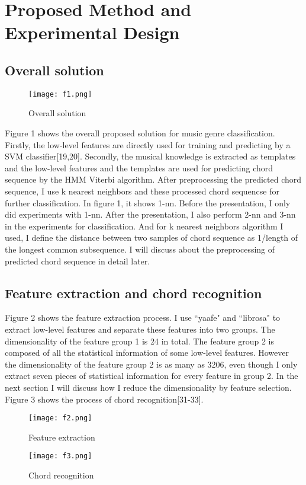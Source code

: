 \documentclass{article} %
\begin{document}
\section{Proposed Method and Experimental Design}
\subsection{Overall solution}
    \begin{figure}[H]
	
	\centering
	\texttt{[image: f1.png]}
	\caption{Overall solution}
	\end{figure}
	Figure 1 shows the overall proposed solution for music genre classification. Firstly, the low-level features are directly used for training and predicting by a SVM classifier[19,20]. Secondly, the musical knowledge is extracted as templates and the low-level features and the templates are used for predicting chord sequence by the HMM Viterbi algorithm. After preprocessing the predicted chord sequence, I use k nearest neighbors and these processed chord sequencse for further classification. In figure 1, it shows 1-nn. Before the presentation, I only did experiments with 1-nn. After the presentation, I also perform 2-nn and 3-nn in the experiments for classification. And for k nearest neighbors algorithm I used, I define the distance between two samples of chord sequence as 1/length of the longest common subsequence. I will discuss about the preprocessing of predicted chord sequence in detail later.
\subsection{Feature extraction and chord recognition}
Figure 2 shows the feature extraction process. I use ``yaafe" and ``librosa" to extract low-level features and separate these features into two groups. The dimensionality of the feature group 1 is 24 in total. The feature group 2 is composed of all the statistical information of some low-level features. However the dimensionality of the feature group 2 is as many as 3206, even though I only extract seven pieces of statistical information for every feature in group 2. In the next section I will discuss how I reduce the dimensionality by feature selection. \\
Figure 3 shows the process of chord recognition[31-33].

\begin{figure}[h]
	
	\centering
	\texttt{[image: f2.png]}
	\caption{Feature extraction}
\end{figure}
\begin{figure}[H]
	
	\centering
	\texttt{[image: f3.png]}
	\caption{Chord recognition}
\end{figure}
\end{document}
